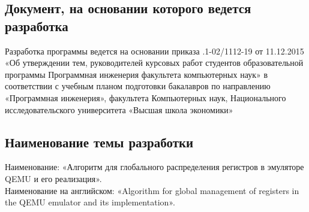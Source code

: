 \subsection{Документ, на основании которого ведется разработка}
Разработка программы ведется на основании приказа 
.1-02/1112-19 от 11.12.2015 
«Об  утверждении  тем,  руководителей  курсовых  работ  студентов
образовательной  программы  Программная  инженерия 
факультета 
компьютерных наук» в соответствии с учебным планом подготовки бакалавров по направлению «Программная инженерия», факультета Компьютерных наук,
Национального исследовательского университета «Высшая школа экономики» 


\subsection{Наименование темы разработки}
Наименование: «Алгоритм для глобального распределения регистров в эмуляторе QEMU и его реализация». \\
Наименование на английском: «Algorithm for global management of registers in the QEMU emulator and its implementation». \\